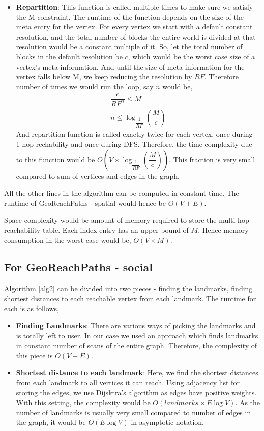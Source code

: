 \begin{itemize}
  \item \textbf{Repartition}: This function is called multiple times to make sure we satisfy the M constraint. The runtime of the function depends on the size of the meta entry for the vertex. For every vertex we start with a default constant resolution, and the total number of blocks the entire world is divided at that resolution would be a constant multiple of it. So, let the total number of blocks in the default resolution be $c$, which would be the worst case size of a vertex's meta information. And until the size of meta information for the vertex falls below M, we keep reducing the resolution by $RF$. Therefore number of times we would run the loop, say $n$ would be,
  \begin{eqnarray*}
  	\dfrac{c}{RF^n} \leq M\\
  	n \leq {\log_{\dfrac{1}{RF}} (\dfrac{M}{c})}
  \end{eqnarray*}
  And repartition function is called exactly twice for each vertex, once during 1-hop rechability and once during DFS. Therefore, the time complexity due to this function would be $O(V \times {\log_{\dfrac{1}{RF}} (\dfrac{M}{c})})$. This fraction is very small compared to sum of vertices and edges in the graph.
\end{itemize}

All the other lines in the algorithm can be computed in constant time. The runtime of GeoReachPaths - spatial would hence be $O(V + E)$.

Space complexity would be amount of memory required to store the multi-hop reachability table. Each index entry has an upper bound of $M$. Hence memory consumption in the worst case would be, $O(V \times M)$.

\subsection{For GeoReachPaths - social}
Algorithm \ref{alg2} can be divided into two pieces - finding the landmarks, finding shortest distances to each reachable vertex from each landmark. The runtime for each is as follows,
\begin{itemize}
	\item \textbf{Finding Landmarks}: There are various ways of picking the landmarks and is totally left to user. In our case we used an approach which finds landmarks in constant number of scans of the entire graph. Therefore, the complexity of this piece is $O(V + E)$.

	\item \textbf{Shortest distance to each landmark}: Here, we find the shortest distances from each landmark to all vertices it can reach. Using adjacency list for storing the edges, we use Dijsktra's algorithm as edges have positive weights. With this setting, the complexity would be $O(landmarks \times E\log V)$. As the number of landmarks is usually very small compared to number of edges in the graph, it would be $O(E\log V)$ in asymptotic notation.
\end{itemize}

